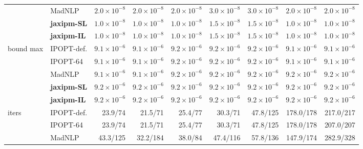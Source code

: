 \begin{table}[p]
{\begin{tabular}{@{}l l r r r r r r r@{}}
 & MadNLP & $2.0\!\times\!10^{-8}$ & $2.0\!\times\!10^{-8}$ & $2.0\!\times\!10^{-8}$ & $3.0\!\times\!10^{-8}$ & $3.0\!\times\!10^{-8}$ & $2.0\!\times\!10^{-8}$ & $2.0\!\times\!10^{-8}$ \\
 & \textbf{jaxipm-SL} & {\boldmath$1.0\!\times\!10^{-8}$} & {\boldmath$1.0\!\times\!10^{-8}$} & {\boldmath$1.0\!\times\!10^{-8}$} & {\boldmath$1.5\!\times\!10^{-8}$} & {\boldmath$1.5\!\times\!10^{-8}$} & {\boldmath$1.0\!\times\!10^{-8}$} & {\boldmath$1.0\!\times\!10^{-8}$} \\
 & \textbf{jaxipm-IL} & {\boldmath$1.0\!\times\!10^{-8}$} & {\boldmath$1.0\!\times\!10^{-8}$} & {\boldmath$1.0\!\times\!10^{-8}$} & {\boldmath$1.5\!\times\!10^{-8}$} & {\boldmath$1.5\!\times\!10^{-8}$} & {\boldmath$1.0\!\times\!10^{-8}$} & {\boldmath$1.0\!\times\!10^{-8}$} \\
\midrule
\multirow{5}{*}{bound max} & IPOPT-def. & $9.1\!\times\!10^{-6}$ & $9.1\!\times\!10^{-6}$ & $9.2\!\times\!10^{-6}$ & $9.2\!\times\!10^{-6}$ & $9.2\!\times\!10^{-6}$ & $9.1\!\times\!10^{-6}$ & $9.1\!\times\!10^{-6}$ \\
 & IPOPT-64 & $9.1\!\times\!10^{-6}$ & $9.1\!\times\!10^{-6}$ & $9.2\!\times\!10^{-6}$ & $9.2\!\times\!10^{-6}$ & $9.2\!\times\!10^{-6}$ & $9.1\!\times\!10^{-6}$ & $9.1\!\times\!10^{-6}$ \\
 & MadNLP & $9.1\!\times\!10^{-6}$ & $9.1\!\times\!10^{-6}$ & $9.2\!\times\!10^{-6}$ & $9.2\!\times\!10^{-6}$ & $9.2\!\times\!10^{-6}$ & $9.2\!\times\!10^{-6}$ & $9.2\!\times\!10^{-6}$ \\
 & \textbf{jaxipm-SL} & {\boldmath$9.2\!\times\!10^{-6}$} & {\boldmath$9.2\!\times\!10^{-6}$} & {\boldmath$9.2\!\times\!10^{-6}$} & {\boldmath$9.2\!\times\!10^{-6}$} & {\boldmath$9.2\!\times\!10^{-6}$} & {\boldmath$9.2\!\times\!10^{-6}$} & {\boldmath$9.2\!\times\!10^{-6}$} \\
 & \textbf{jaxipm-IL} & {\boldmath$9.2\!\times\!10^{-6}$} & {\boldmath$9.2\!\times\!10^{-6}$} & {\boldmath$9.2\!\times\!10^{-6}$} & {\boldmath$9.2\!\times\!10^{-6}$} & {\boldmath$9.2\!\times\!10^{-6}$} & {\boldmath$9.2\!\times\!10^{-6}$} & {\boldmath$9.2\!\times\!10^{-6}$} \\
\midrule
\multirow{5}{*}{iters} & IPOPT-def. & 23.9/74 & 21.5/71 & 25.4/77 & 30.3/71 & 47.8/125 & 178.0/178 & 217.0/217 \\
 mean/max & IPOPT-64 & 23.9/74 & 21.5/71 & 25.4/77 & 30.3/71 & 47.8/125 & 178.0/178 & 207.0/207 \\
 & MadNLP & 43.3/125 & 32.2/184 & 38.0/84 & 47.4/116 & 57.8/136 & 147.9/174 & 282.9/328 \\

\end{tabular}}
\end{table}
